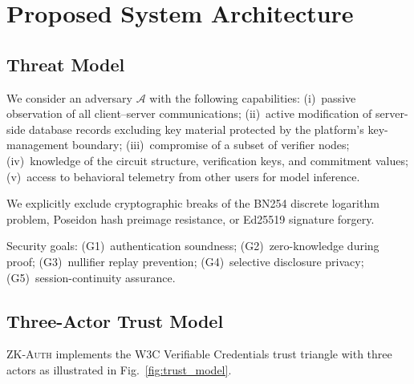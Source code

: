 \documentclass[journal,twoside,10pt]{IEEEtran}
\begin{document}
\section{Proposed System Architecture}
\label{sec:architecture}

\subsection{Threat Model}

We consider an adversary $\mathcal{A}$ with the following capabilities:
(i)~passive observation of all client--server communications;
(ii)~active modification of server-side database records excluding key
material protected by the platform's key-management boundary;
(iii)~compromise of a subset of verifier nodes;
(iv)~knowledge of the circuit structure, verification keys, and commitment
values;
(v)~access to behavioral telemetry from other users for model inference.

We explicitly exclude cryptographic breaks of the BN254 discrete logarithm
problem, Poseidon hash preimage resistance, or Ed25519 signature forgery.

Security goals: (G1)~authentication soundness; (G2)~zero-knowledge during
proof; (G3)~nullifier replay prevention; (G4)~selective disclosure privacy; (G5)~session-continuity
assurance.

\subsection{Three-Actor Trust Model}

\textsc{ZK-Auth} implements the W3C Verifiable Credentials trust triangle
with three actors as illustrated in Fig.~\ref{fig:trust_model}.
\end{document}
